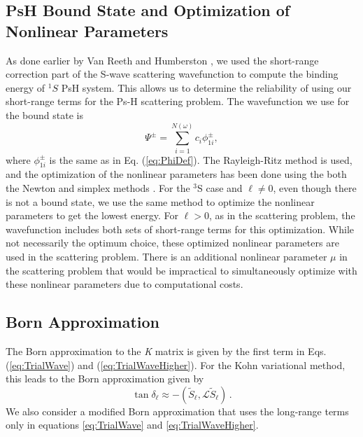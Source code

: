 \documentclass[preprint,showpacs,preprintnumbers,amsmath,amssymb,longbibliography,pra,aps]{revtex4-1}
\begin{document}

\subsection{PsH Bound State and Optimization of Nonlinear Parameters}
As done earlier by Van Reeth and Humberston \cite{VanReeth2003,VanReeth2004}, we used the short-range correction part of the S-wave scattering wavefunction to compute the binding energy of $^1S$ PsH system. This allows us to determine the reliability of using our short-range terms for the Ps-H scattering problem. The wavefunction we use for the bound state is
\begin{equation}
\label{eq:BoundWavefn}
\Psi^\pm = \sum_{i=1}^{N(\omega)} c_i \phi_{1i}^\pm,
\end{equation}
where $\phi_{1i}^\pm$ is the same as in Eq. (\ref{eq:PhiDef}). The Rayleigh-Ritz method is used, and the optimization of the nonlinear parameters has been done using the both the Newton and simplex methods \cite{Yan1999,GSL}. For the $^3$S case and $\ell \neq 0$, even though there is not a bound state, we use the same method to optimize the nonlinear parameters to get the lowest energy. For $\ell > 0$, as in the scattering problem, the wavefunction includes both sets of short-range terms for this optimization. While not necessarily the optimum choice, these optimized nonlinear parameters are used in the scattering problem. There is an additional nonlinear parameter $\mu$ in the scattering problem that would be impractical to simultaneously optimize with these nonlinear parameters due to computational costs.

\subsection{Born Approximation}
The Born approximation to the \emph{K} matrix \cite{Bransden2003} is given by the first term in Eqs. (\ref{eq:TrialWave}) and (\ref{eq:TrialWaveHigher}). For the Kohn variational method, this leads to the Born approximation given by
\begin{equation}
\label{eq:Born}
\tan\delta_\ell \approx -(\widetilde{S}_\ell,\mathcal{L}\widetilde{S}_\ell )\, .
\end{equation}
We also consider a modified Born approximation that uses the long-range terms only in equations \ref{eq:TrialWave} and \ref{eq:TrialWaveHigher}.
\end{document}
